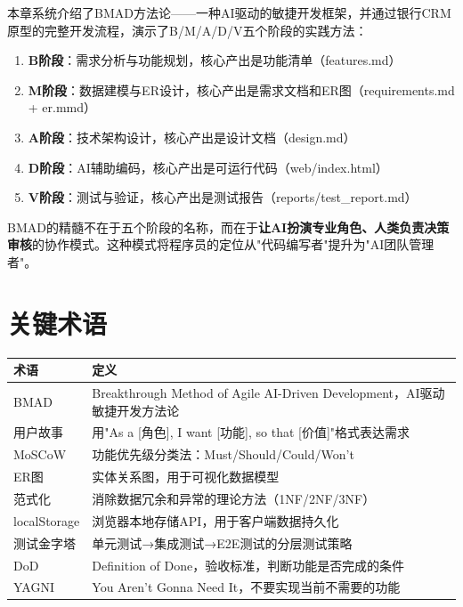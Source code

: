 本章系统介绍了BMAD方法论——一种AI驱动的敏捷开发框架，并通过银行CRM原型的完整开发流程，演示了B/M/A/D/V五个阶段的实践方法：

\begin{enumerate}[leftmargin=2em]
  \item \textbf{B阶段}：需求分析与功能规划，核心产出是功能清单（features.md）
  \item \textbf{M阶段}：数据建模与ER设计，核心产出是需求文档和ER图（requirements.md + er.mmd）
  \item \textbf{A阶段}：技术架构设计，核心产出是设计文档（design.md）
  \item \textbf{D阶段}：AI辅助编码，核心产出是可运行代码（web/index.html）
  \item \textbf{V阶段}：测试与验证，核心产出是测试报告（reports/test\_report.md）
\end{enumerate}

BMAD的精髓不在于五个阶段的名称，而在于\textbf{让AI扮演专业角色、人类负责决策审核}的协作模式。这种模式将程序员的定位从"代码编写者"提升为"AI团队管理者"。

\section{关键术语}

\begin{table}[H]
\centering
\small
\begin{tabular}{lp{9cm}}
\toprule
\textbf{术语} & \textbf{定义} \\
\midrule
BMAD & Breakthrough Method of Agile AI-Driven Development，AI驱动敏捷开发方法论 \\
用户故事 & 用"As a [角色], I want [功能], so that [价值]"格式表达需求 \\
MoSCoW & 功能优先级分类法：Must/Should/Could/Won't \\
ER图 & 实体关系图，用于可视化数据模型 \\
范式化 & 消除数据冗余和异常的理论方法（1NF/2NF/3NF） \\
localStorage & 浏览器本地存储API，用于客户端数据持久化 \\
测试金字塔 & 单元测试→集成测试→E2E测试的分层测试策略 \\
DoD & Definition of Done，验收标准，判断功能是否完成的条件 \\
YAGNI & You Aren't Gonna Need It，不要实现当前不需要的功能 \\
\bottomrule
\end{tabular}
\end{table}


